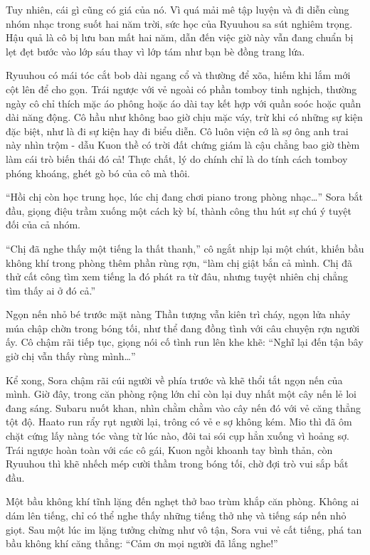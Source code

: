 \documentclass[../main.tex]{subfiles}
\begin{document}
Tuy nhiên, cái gì cũng có giá của nó. Vì quá mải mê tập luyện và đi diễn cùng nhóm nhạc trong suốt hai năm trời, sức học của Ryuuhou sa sút nghiêm trọng. Hậu quả là cô bị lưu ban mất hai năm, dẫn đến việc giờ này vẫn đang chuẩn bị lẹt đẹt bước vào lớp sáu thay vì lớp tám như bạn bè đồng trang lứa.

Ryuuhou có mái tóc cắt bob dài ngang cổ và thường để xõa, hiếm khi lắm mới cột lên để cho gọn. Trái ngược với vẻ ngoài có phần tomboy tinh nghịch, thường ngày cô chỉ thích mặc áo phông hoặc áo dài tay kết hợp với quần soóc hoặc quần dài năng động. Cô hầu như không bao giờ chịu mặc váy, trừ khi có những sự kiện đặc biệt, như là đi sự kiện hay đi biểu diễn. Cô luôn viện cớ là sợ ông anh trai này nhìn trộm - dẫu Kuon thề có trời đất chứng giám là cậu chẳng bao giờ thèm làm cái trò biến thái đó cả! Thực chất, lý do chính chỉ là do tính cách tomboy phóng khoáng, ghét gò bó của cô mà thôi.

\chrint


``Hồi chị còn học trung học, lúc chị đang chơi piano trong phòng nhạc\dots'' Sora bắt đầu, giọng điệu trầm xuống một cách kỳ bí, thành công thu hút sự chú ý tuyệt đối của cả nhóm.

``Chị đã nghe thấy một tiếng la thất thanh,'' cô ngắt nhịp lại một chút, khiến bầu không khí trong phòng thêm phần rùng rợn, ``làm chị giật bắn cả mình. Chị đã thử cất công tìm xem tiếng la đó phát ra từ đâu, nhưng tuyệt nhiên chị chẳng tìm thấy ai ở đó cả.''

Ngọn nến nhỏ bé trước mặt nàng Thần tượng vẫn kiên trì cháy, ngọn lửa nhảy múa chập chờn trong bóng tối, như thể đang đồng tình với câu chuyện rợn người ấy. Cô chậm rãi tiếp tục, giọng nói cố tình run lên khe khẽ: ``Nghĩ lại đến tận bây giờ chị vẫn thấy rùng mình\dots''

Kể xong, Sora chậm rãi cúi người về phía trước và khẽ thổi tắt ngọn nến của mình. Giờ đây, trong căn phòng rộng lớn chỉ còn lại duy nhất một cây nến lẻ loi đang sáng. Subaru nuốt khan, nhìn chằm chằm vào cây nến đó với vẻ căng thẳng tột độ. Haato run rẩy rụt người lại, trông có vẻ e sợ không kém. Mio thì đã ôm chặt cứng lấy nàng tóc vàng từ lúc nào, đôi tai sói cụp hẳn xuống vì hoảng sợ. Trái ngược hoàn toàn với các cô gái, Kuon ngồi khoanh tay bình thản, còn Ryuuhou thì khẽ nhếch mép cười thầm trong bóng tối, chờ đợi trò vui sắp bắt đầu.


Một bầu không khí tĩnh lặng đến nghẹt thở bao trùm khắp căn phòng. Không ai dám lên tiếng, chỉ có thể nghe thấy những tiếng thở nhẹ và tiếng sáp nến nhỏ giọt. Sau một lúc im lặng tưởng chừng như vô tận, Sora vui vẻ cất tiếng, phá tan bầu không khí căng thẳng: ``Cảm ơn mọi người đã lắng nghe!''
\end{document}
